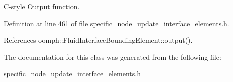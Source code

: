 C-\/style Output function. 



Definition at line 461 of file specific\+\_\+node\+\_\+update\+\_\+interface\+\_\+elements.\+h.



References oomph\+::\+Fluid\+Interface\+Bounding\+Element\+::output().



The documentation for this class was generated from the following file\+:\begin{DoxyCompactItemize}
\item 
\hyperlink{specific__node__update__interface__elements_8h}{specific\+\_\+node\+\_\+update\+\_\+interface\+\_\+elements.\+h}\end{DoxyCompactItemize}

